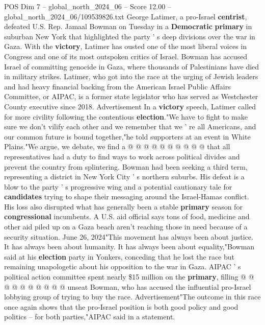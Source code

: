 \begin{textsample}{POS Dim 7 – global\_north\_2024\_06 – Score 12.00 – global\_north\_2024\_06/109539826.txt}  \label{ex:f7_pos_082}
George Latimer, a pro-Israel \textbf{centrist}, defeated U.S.
Rep.
Jamaal Bowman on Tuesday in a \textbf{Democratic} \textbf{primary} in suburban New York that highlighted the party ' s deep divisions over the war in Gaza.
With the \textbf{victory}, Latimer has ousted one of the most liberal voices in Congress and one of its most outspoken critics of Israel.
Bowman has accused Israel of committing genocide in Gaza, where thousands of Palestinians have died in military strikes.
Latimer, who got into the race at the urging of Jewish leaders and had heavy financial backing from the American Israel Public Affairs Committee, or AIPAC, is a former state legislator who has served as Westchester County executive since 2018.
Advertisement In a \textbf{victory} speech, Latimer called for more civility following the contentious \textbf{election}."We have to fight to make sure we don't vilify each other and we remember that we ' re all Americans, and our common future is bound together,"he told supporters at an event in White Plains."We argue, we debate, we find a @ @ @ @ @ @ @ @ @ @ that all representatives had a duty to find ways to work across political divides and prevent the country from splintering.
Bowman had been seeking a third term, representing a district in New York City ' s northern suburbs.
His defeat is a blow to the party ' s progressive wing and a potential cautionary tale for \textbf{candidates} trying to shape their messaging around the Israel-Hamas conflict.
His loss also disrupted what has generally been a stable \textbf{primary} season for \textbf{congressional} incumbents.
A U.S. aid official says tons of food, medicine and other aid piled up on a Gaza beach aren't reaching those in need because of a security situation.
June 26, 2024"This movement has always been about justice.
It has always been about humanity.
It has always been about equality,"Bowman said at his \textbf{election} party in Yonkers, conceding that he lost the race but remaining unapologetic about his opposition to the war in Gaza.
AIPAC ' s political action committee spent nearly \$15 million on the \textbf{primary}, filling @ @ @ @ @ @ @ @ @ @ unseat Bowman, who has accused the influential pro-Israel lobbying group of trying to buy the race.
Advertisement"The outcome in this race once again shows that the pro-Israel position is both good policy and good politics -- for both parties,"AIPAC said in a statement.

\end{textsample}
